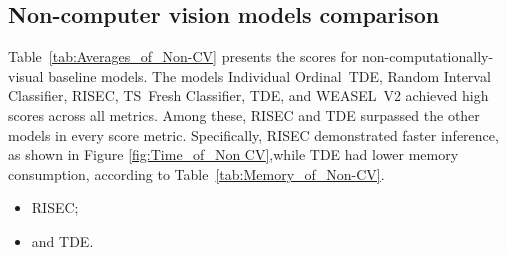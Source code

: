 




\FloatBarrier

\subsection{Non-computer vision models comparison}


Table~\ref{tab:Averages_of_Non-CV} presents the scores for non-computationally-visual baseline models. The models Individual \mbox{Ordinal TDE}, Random Interval Classifier, \gls{RISEC}, \mbox{TS Fresh} Classifier, \gls{TDE}, and \mbox{WEASEL V2} achieved high scores across all metrics. Among these, \gls{RISEC} and \gls{TDE} surpassed the other models in every score metric. Specifically, \gls{RISEC} demonstrated faster inference, as shown in Figure \ref{fig:Time_of_Non CV},while \gls{TDE} had lower memory consumption, according to Table~\ref{tab:Memory_of_Non-CV}.  
\begin{itemize}
	\item \gls{RISEC};
	\item and \gls{TDE}.
\end{itemize}


